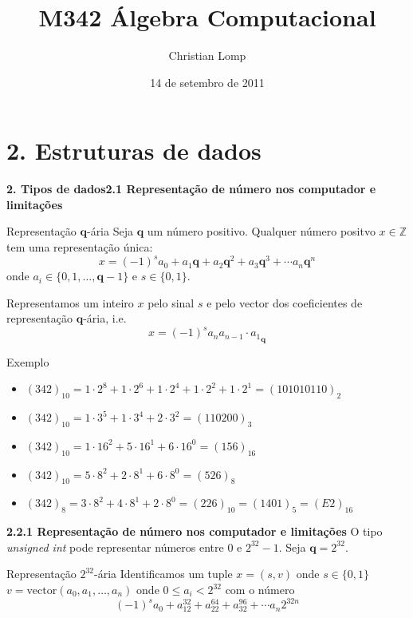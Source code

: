 \documentclass{beamer}
\title[M342]{M342 Álgebra Computacional}
\author{Christian Lomp}
\institute{FCUP}
\date{14 de setembro de 2011}
\newcommand{\q}{\mathbf{q}}
\newcommand{\ZZ}{\mathbb Z}
\newcommand{\cvector}[1]{\mathrm{vector}(#1)}
\begin{document}
\begin{frame}
\titlepage
\end{frame}





\section{2. Estruturas de dados}

\begin{frame}{\bf 2. Tipos de dados}{\bf 2.1 Representação de número nos computador e limitações}

\begin{block}{Representação $\q$-ária}
Seja $\q$ um número positivo. Qualquer número positvo $x\in \ZZ$ tem uma representação única:
$$ x = (-1)^s a_0 + a_1\q + a_2\q^2 + a_3\q^3 + \cdots a_n\q^n$$
onde $a_i \in \{0,1,\ldots, \q-1\}$ e $s\in\{0,1\}$.
\end{block}

Representamos um inteiro $x$ pelo sinal $s$ e pelo vector dos coeficientes de representação $\q$-ária, i.e.
$$x = (-1)^s {a_na_{n-1}\cdot a_1}_{\q}$$

\end{frame}

\begin{frame}
 \begin{block}{Exemplo}
  \begin{itemize}
   \item $(342)_{10} = 1\cdot 2^8 + 1\cdot 2^6 + 1\cdot 2^4+1\cdot 2^2 + 1\cdot 2^1 = (101010110)_2$
   \item $(342)_{10} = 1\cdot 3^5 + 1\cdot 3^4 + 2\cdot 3^2 = (110200)_3$
   \item $(342)_{10} = 1\cdot {16}^2 + 5\cdot {16}^1 + 6\cdot {16}^0 =  (156)_{16}$   
   \item $(342)_{10} = 5\cdot 8^2 + 2\cdot {8}^1 + 6\cdot {8}^0 =  (526)_{8}$   
   \item $(342)_{8} = 3\cdot {8}^2 + 4\cdot {8}^1 + 2\cdot {8}^0 =  (226)_{10} = (1401)_5 = (E 2)_{16}$
  \end{itemize}

 \end{block}

\end{frame}


\begin{frame}{\bf 2.}{\bf 2.1 Representação de número nos computador e limitações}
O tipo {\it unsigned int} pode representar números entre $0$ e $2^{32}-1$. Seja $\q=2^{32}$.

\begin{block}{Representação $2^{32}$-ária}
Identificamos um tuple $x=(s,v)$ onde $s\in \{0,1\}$ $v=\cvector{a_0,a_1,\ldots, a_n}$ onde $0\leq a_i < 2^{32}$ com o número 
$$ (-1)^s a_0 + a_12^{32} + a_22^{64} + a_32^{96} + \cdots a_n2^{32n}$$
\end{block}


\end{frame}
\end{document}
